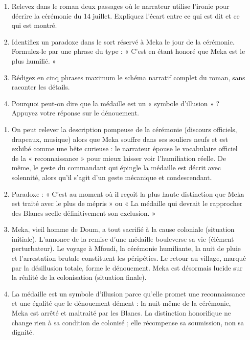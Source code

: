 \documentclass[11pt]{article}
\begin{document}
\begin{exercice}
\begin{enumerate}
\item Relevez dans le roman deux passages où le narrateur utilise l'ironie pour décrire la cérémonie du 14 juillet. Expliquez l'écart entre ce qui est dit et ce qui est montré.
\item Identifiez un paradoxe dans le sort réservé à Meka le jour de la cérémonie. Formulez-le par une phrase du type : « C'est en étant honoré que Meka est le plus humilié. »
\item Rédigez en cinq phrases maximum le schéma narratif complet du roman, sans raconter les détails.
\item Pourquoi peut-on dire que la médaille est un « symbole d'illusion » ? Appuyez votre réponse sur le dénouement.
\end{enumerate}
\end{exercice}

\begin{corrige}
\begin{enumerate}
\item On peut relever la description pompeuse de la cérémonie (discours officiels, drapeaux, musique) alors que Meka souffre dans ses souliers neufs et est exhibé comme une bête curieuse : le narrateur épouse le vocabulaire officiel de la « reconnaissance » pour mieux laisser voir l'humiliation réelle. De même, le geste du commandant qui épingle la médaille est décrit avec solennité, alors qu'il s'agit d'un geste mécanique et condescendant.
\item Paradoxe : « C'est au moment où il reçoit la plus haute distinction que Meka est traité avec le plus de mépris » ou « La médaille qui devrait le rapprocher des Blancs scelle définitivement son exclusion. »
\item Meka, vieil homme de Doum, a tout sacrifié à la cause coloniale (situation initiale). L'annonce de la remise d'une médaille bouleverse sa vie (élément perturbateur). Le voyage à Mfoudi, la cérémonie humiliante, la nuit de pluie et l'arrestation brutale constituent les péripéties. Le retour au village, marqué par la désillusion totale, forme le dénouement. Meka est désormais lucide sur la réalité de la colonisation (situation finale).
\item La médaille est un symbole d'illusion parce qu'elle promet une reconnaissance et une égalité que le dénouement dément : la nuit même de la cérémonie, Meka est arrêté et maltraité par les Blancs. La distinction honorifique ne change rien à sa condition de colonisé ; elle récompense sa soumission, non sa dignité.
\end{enumerate}
\end{corrige}
\end{document}
